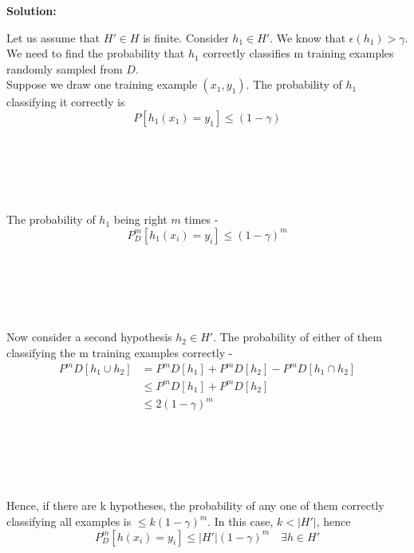 \documentclass{article}
\begin{document}


\textbf{\LARGE{Solution:}}\Large{ Let us assume that $H' \in H$ is finite. Consider $h_1 \in H'$. We know that $\epsilon(h_1) > \gamma$. We need to find the probability that $h_1$ correctly classifies m training examples randomly sampled from $D$.\\

Suppose we draw one training example $(x_1,y_1)$. The probability of $h_1$ classifying it correctly is
\begin{equation*}
    P[h_1(x_1) = y_1] \leq (1 - \gamma)
\end{equation*}

\\\\\\\


The probability of $h_1$ being right $m$ times - 
\begin{equation*}
    P^{m}_{D}[h_1(x_i) = y_i] \leq (1 - \gamma)^m
\end{equation*}

\\\\\\\

Now consider a second hypothesis $h_2 \in H'$. The probability of either of them classifying the m training examples correctly -
\begin{equation*}
\begin{split}
    P^{m}{D}[h_1 \cup h_2] & = P^{m}{D}[h_1] + P^{m}{D}[h_2] - P^{m}{D}[h_1 \cap h_2] \\
     & \leq P^{m}{D}[h_1] + P^{m}{D}[h_2] \\
     & \leq 2(1 - \gamma)^m 
\end{split}
\end{equation*}


\\\\\\\

Hence, if there are k hypotheses, the probability of any one of them correctly classifying all examples is $\leq k(1 - \gamma)^m$. In this case, $k < |H'|$, hence
\begin{equation*}
    P^{m}_{D}[h(x_i) = y_i] \leq |H'|(1 - \gamma)^m \quad \exists h \in H'
\end{equation*}

}
\end{document}
